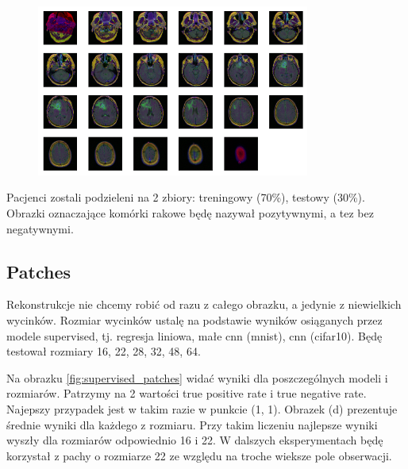 \begin{figure}[h!]
    \centering
    \includegraphics[width=0.8\textwidth]{images/medical_sample}
    \caption{}
    \label{fig:medical_sample}
\end{figure}

Pacjenci zostali podzieleni na 2 zbiory: treningowy (70\%), testowy (30\%). Obrazki oznaczające komórki rakowe będę nazywał pozytywnymi, a tez bez negatywnymi.

\subsection{Patches}

Rekonstrukcje nie chcemy robić od razu z całego obrazku, a jedynie z niewielkich wycinków. Rozmiar wycinków ustalę na podstawie wyników osiąganych przez modele supervised, tj. regresja liniowa, małe cnn (mnist), cnn (cifar10). Będę testował rozmiary 16, 22, 28, 32, 48, 64. 

Na obrazku \ref{fig:supervised_patches} widać wyniki dla poszczególnych modeli i rozmiarów. Patrzymy na 2 wartości true positive rate i true negative rate. Najepszy przypadek jest w takim razie w punkcie (1, 1). Obrazek (d) prezentuje średnie wyniki dla każdego z rozmiaru. Przy takim liczeniu najlepsze wyniki wyszły dla rozmiarów odpowiednio 16 i 22. W dalszych eksperymentach będę korzystał z pachy o rozmiarze 22 ze względu na troche wieksze pole obserwacji.

